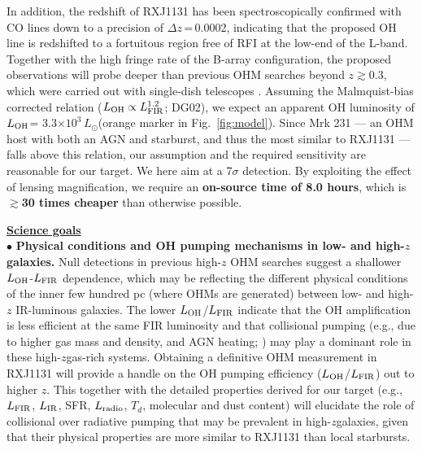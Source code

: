 \documentclass[letterpaper,11pt]{article}
\newcommand{\Lsun}{\mbox{$L_{\odot}$}\xspace}
\newcommand{\LIR}{\mbox{$L_{\rm IR}$}\xspace}
\newcommand{\LFIR}{\mbox{$L_{\rm FIR}$}\xspace}
\newcommand{\LOH}{$L_{\rm OH}$\xspace}
\newcommand{\Fig}[1]{Fig.~\ref{fig:#1}}
\newcommand{\E}[1]{\mbox{$\times10^{#1}$}}
\newcommand{\eq}{\,=\,}
\newcommand{\ssim}{\,$\sim$\,}
\newcommand{\highz}{high-$z$\space}
\newcommand{\obs}{observations\xspace}
\begin{document}
\noindent In addition, the redshift of RXJ1131 has been spectroscopically confirmed with CO lines down to a precision of
$\Delta z$\eq0.0002, indicating that the proposed OH line is redshifted to a fortuitous region
free of RFI at the low-end of the L-band.
Together with the high fringe rate of the B-array configuration, the proposed \obs will
probe deeper than previous OHM searches beyond $z$$\gtrsim$0.3, which were carried out
with single-dish telescopes \citep[\Fig{model}b; e.g.][]{Darling02a, Willett12a}.
Assuming the Malmquist-bias corrected relation
($L_{\rm OH}\propto L_{\rm FIR}^{1.2}$; DG02), 
we expect an apparent OH luminosity of \LOH= 3.3\E{3}\,\Lsun (orange marker in \Fig{model}).
Since Mrk 231 --- an OHM host with both an AGN and starburst, and thus the most similar to RXJ1131 ---
falls above this relation, our assumption and the required sensitivity are reasonable for our target.
We here aim at a 7$\sigma$ detection.
By exploiting the effect of lensing magnification, we require an {\bf on-source time of 8.0 hours}, which
is {\bf $\gtrsim$30 times cheaper}
than otherwise possible.

\noindent \underline{\textbf{Science goals}}
\vspace{.2em}\\
\noindent $\bullet$ {\bf Physical conditions and OH pumping mechanisms in low- and high-$z$ galaxies.}
Null detections in previous high-$z$ OHM searches suggest a shallower \LOH-\LFIR dependence, which may be
reflecting the different physical conditions of the inner few hundred pc (where OHMs are generated)
between low- and high-$z$ IR-luminous galaxies.
The lower \LOH/\LFIR indicate that the OH amplification is less efficient at the same FIR luminosity
and that collisional pumping (e.g., due to higher gas mass and density, and 
AGN heating; \citealt{Field94a}) %
%
may play a dominant role in these \highz gas-rich systems.
Obtaining a definitive OHM measurement in RXJ1131 will provide a handle on the OH pumping efficiency (\LOH/\LFIR) out to higher $z$.
This together with the detailed properties derived for our target (e.g., \LFIR, \LIR, SFR, $L_{\rm radio}$, $T_{d}$, molecular and dust content)
will elucidate the role of collisional over radiative pumping
that may be prevalent in \highz galaxies, given that their physical properties are more similar to RXJ1131 than
local starbursts. %
\end{document}

